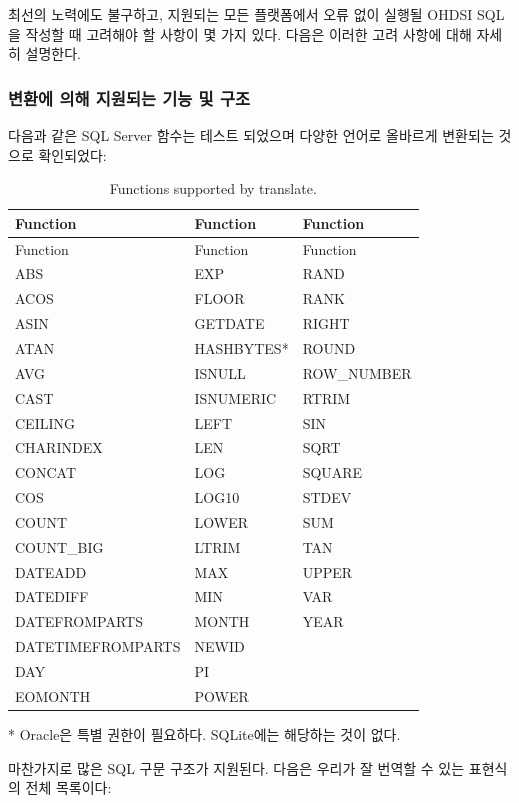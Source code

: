 \documentclass[10.5pt]{book}
\theoremstyle{definition}
\theoremstyle{definition}
\theoremstyle{definition}
\theoremstyle{remark}
\begin{document}
최선의 노력에도 불구하고, 지원되는 모든 플랫폼에서 오류 없이 실행될
OHDSI SQL을 작성할 때 고려해야 할 사항이 몇 가지 있다. 다음은 이러한
고려 사항에 대해 자세히 설명한다.

\subsubsection*{변환에 의해 지원되는 기능 및 구조}\label{-----}

다음과 같은 SQL Server 함수는 테스트 되었으며 다양한 언어로 올바르게
변환되는 것으로 확인되었다: 

\begin{longtable}[]{@{}lll@{}}
\caption{\label{tab:sqlFunctions} Functions supported by
translate.}\tabularnewline
\toprule
Function & Function & Function\tabularnewline
\midrule
\endfirsthead
\toprule
Function & Function & Function\tabularnewline
\midrule
\endhead
ABS & EXP & RAND\tabularnewline
ACOS & FLOOR & RANK\tabularnewline
ASIN & GETDATE & RIGHT\tabularnewline
ATAN & HASHBYTES* & ROUND\tabularnewline
AVG & ISNULL & ROW\_NUMBER\tabularnewline
CAST & ISNUMERIC & RTRIM\tabularnewline
CEILING & LEFT & SIN\tabularnewline
CHARINDEX & LEN & SQRT\tabularnewline
CONCAT & LOG & SQUARE\tabularnewline
COS & LOG10 & STDEV\tabularnewline
COUNT & LOWER & SUM\tabularnewline
COUNT\_BIG & LTRIM & TAN\tabularnewline
DATEADD & MAX & UPPER\tabularnewline
DATEDIFF & MIN & VAR\tabularnewline
DATEFROMPARTS & MONTH & YEAR\tabularnewline
DATETIMEFROMPARTS & NEWID &\tabularnewline
DAY & PI &\tabularnewline
EOMONTH & POWER &\tabularnewline
\bottomrule
\end{longtable}

* Oracle은 특별 권한이 필요하다. SQLite에는 해당하는 것이 없다.

마찬가지로 많은 SQL 구문 구조가 지원된다. 다음은 우리가 잘 번역할 수
있는 표현식의 전체 목록이다:
\end{document}
